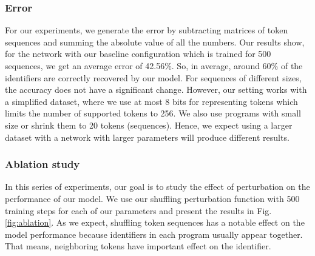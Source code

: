 \documentclass[acmsmall]{acmart}
\begin{document}
\subsubsection{Error}
For our experiments, we generate the error by subtracting matrices of token sequences and summing the absolute value of all the numbers. Our results show, for the network with our baseline configuration which is trained for 500 sequences, we get an average error of 42.56\%. So, in average, around 60\% of the identifiers are correctly recovered by our model. For sequences of different sizes, the accuracy does not have a significant change. However, our setting works with a simplified dataset, where we use at most 8 bits for representing tokens which limits the number of supported tokens to 256. We also use programs with small size or shrink them to 20 tokens (sequences). Hence, we expect using a larger dataset with a network with larger parameters will produce different results.

\subsubsection{Ablation study}
In this series of experiments, our goal is to study the effect of perturbation on the performance of our model. We use our shuffling perturbation function with 500 training steps for each of our parameters and present the results in Fig. \ref{fig:ablation}. As we expect, shuffling token sequences has a notable effect on the model performance because identifiers in each program usually appear together. That means, neighboring tokens have important effect on the identifier.
\end{document}
